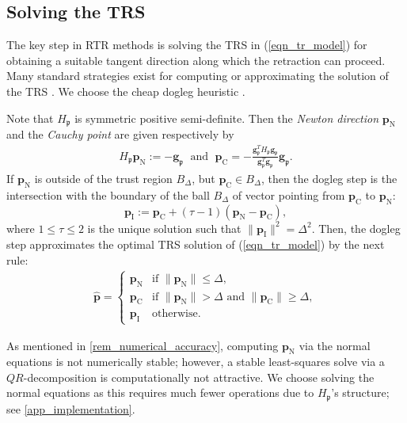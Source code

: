 \documentclass[a4paper,10pt,final]{siamart1116}
\newcommand{\tuple}[1]{\mathfrak{#1}}
\newcommand{\vect}[1]{\mathbf{#1}}
\newcommand{\refeqn}[1]{{(\ref{#1})}}
\newcommand{\refapp}[1]{{\cref{#1}}}
\newcommand{\refrem}[1]{{\cref{#1}}}
\numberwithin{equation}{section}
\numberwithin{figure}{section}
\numberwithin{table}{section}
\numberwithin{theorem}{section}
\begin{document}
\subsection{Solving the TRS} \label{sec_tr_subproblem}
The key step in RTR methods is solving the TRS in \refeqn{eqn_tr_model} for obtaining a suitable tangent direction along which the retraction can proceed. Many standard strategies exist for computing or approximating the solution of the TRS \cite{NW2006}. We choose the cheap dogleg heuristic \cite[section 4.1]{NW2006}.

Note that $H_{\tuple{p}}$ is symmetric positive semi-definite. Then the \emph{Newton direction} $\vect{p}_{\text{N}}$ and the \emph{Cauchy point} are given respectively by
\begin{align} \label{eqn_GN_and_CP}
 H_{\tuple{p}} \vect{p}_{\text{N}} := -\vect{g}_{\tuple{p}}
 \;\text{ and }\;
\vect{p}_{\text{C}} = - \frac{\vect{g}_{\tuple{p}}^T H_{\tuple{p}} \vect{g}_{\tuple{p}}}{\vect{g}_{\tuple{p}}^T \vect{g}_{\tuple{p}}} \vect{g}_{\tuple{p}}.
 \end{align}
If $\vect{p}_{\text{N}}$ is outside of the trust region $B_{\Delta}$, but $\vect{p}_{\text{C}} \in B_{\Delta}$, then the dogleg step is the intersection with the boundary of the ball $B_{\Delta}$ of vector pointing from $\vect{p}_{\text{C}}$ to $\vect{p}_{\text{N}}$:
\[
 \vect{p}_{\text{I}} := \vect{p}_{\text{C}} + (\tau-1)(\vect{p}_{\text{N}} - \vect{p}_{\text{C}}),
\]
where $1 \le \tau \le 2$ is the unique solution such that $\| \vect{p}_{\text{I}} \|^2 = \Delta^2$.
Then, the dogleg step approximates the optimal TRS solution of \refeqn{eqn_tr_model} by the next rule:
\begin{align} \label{eqn_dogleg_step}
\widehat{\vect{p}} =
 \begin{cases}
  \vect{p}_{\text{N}} & \text{if } \| \vect{p}_{\text{N}} \| \le \Delta, \\
  \vect{p}_{\text{C}} & \text{if } \| \vect{p}_{\text{N}} \| > \Delta \text{ and } \| \vect{p}_{\text{C}} \| \ge \Delta, \\
  \vect{p}_{\text{I}} & \text{otherwise}.
 \end{cases}
\end{align}

As mentioned in \refrem{rem_numerical_accuracy}, computing $\vect{p}_{\text{N}}$ via the normal equations is not numerically stable; however, a stable least-squares solve via a $QR$-decomposition is computationally not attractive. We choose solving the normal equations as this requires much fewer operations due to $H_{\tuple{p}}$'s structure; see \refapp{app_implementation}.
\end{document}
